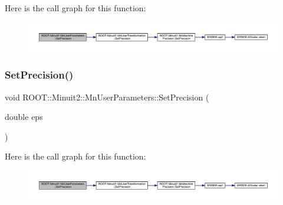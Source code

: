Here is the call graph for this function\+:
\nopagebreak
\begin{figure}[H]
\begin{center}
\leavevmode
\includegraphics[width=350pt]{d6/d10/classROOT_1_1Minuit2_1_1MnUserParameters_aceaa10ac8b2c83261c3cc026705ee6e0_cgraph}
\end{center}
\end{figure}
\mbox{\label{classROOT_1_1Minuit2_1_1MnUserParameters_aceaa10ac8b2c83261c3cc026705ee6e0}} 
\subsubsection{\texorpdfstring{SetPrecision()}{SetPrecision()}\hspace{0.1cm}{\footnotesize\ttfamily [2/3]}}
{\footnotesize\ttfamily void R\+O\+O\+T\+::\+Minuit2\+::\+Mn\+User\+Parameters\+::\+Set\+Precision (\begin{DoxyParamCaption}\item[{double}]{eps }\end{DoxyParamCaption})\hspace{0.3cm}{\ttfamily [inline]}}

Here is the call graph for this function\+:
\nopagebreak
\begin{figure}[H]
\begin{center}
\leavevmode
\includegraphics[width=350pt]{d6/d10/classROOT_1_1Minuit2_1_1MnUserParameters_aceaa10ac8b2c83261c3cc026705ee6e0_cgraph}
\end{center}
\end{figure}
\mbox{\label{classROOT_1_1Minuit2_1_1MnUserParameters_aceaa10ac8b2c83261c3cc026705ee6e0}} 
